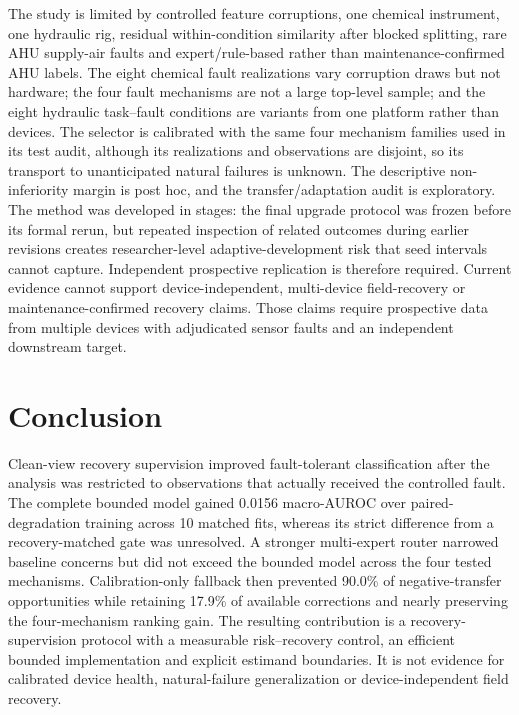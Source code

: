 \documentclass[11pt]{article}
\begin{document}
The study is limited by controlled feature corruptions, one chemical instrument, one hydraulic rig, residual within-condition similarity after blocked splitting, rare AHU supply-air faults and expert/rule-based rather than maintenance-confirmed AHU labels. The eight chemical fault realizations vary corruption draws but not hardware; the four fault mechanisms are not a large top-level sample; and the eight hydraulic task--fault conditions are variants from one platform rather than devices. The selector is calibrated with the same four mechanism families used in its test audit, although its realizations and observations are disjoint, so its transport to unanticipated natural failures is unknown. The descriptive non-inferiority margin is post hoc, and the transfer/adaptation audit is exploratory. The method was developed in stages: the final upgrade protocol was frozen before its formal rerun, but repeated inspection of related outcomes during earlier revisions creates researcher-level adaptive-development risk that seed intervals cannot capture. Independent prospective replication is therefore required. Current evidence cannot support device-independent, multi-device field-recovery or maintenance-confirmed recovery claims. Those claims require prospective data from multiple devices with adjudicated sensor faults and an independent downstream target.

\section{Conclusion}

Clean-view recovery supervision improved fault-tolerant classification after the analysis was restricted to observations that actually received the controlled fault. The complete bounded model gained 0.0156 macro-AUROC over paired-degradation training across 10 matched fits, whereas its strict difference from a recovery-matched gate was unresolved. A stronger multi-expert router narrowed baseline concerns but did not exceed the bounded model across the four tested mechanisms. Calibration-only fallback then prevented 90.0\% of negative-transfer opportunities while retaining 17.9\% of available corrections and nearly preserving the four-mechanism ranking gain. The resulting contribution is a recovery-supervision protocol with a measurable risk--recovery control, an efficient bounded implementation and explicit estimand boundaries. It is not evidence for calibrated device health, natural-failure generalization or device-independent field recovery.
\end{document}
